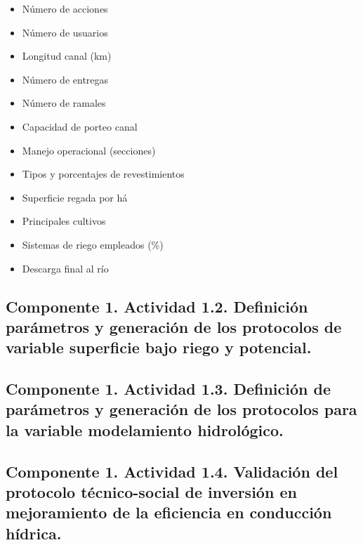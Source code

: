 \documentclass[]{article}
\begin{document}
\begin{itemize}
\item Número de acciones
\item Número de usuarios
\item Longitud canal (km)
\item Número de entregas
\item Número de ramales
\item Capacidad de porteo canal
\item Manejo operacional (secciones)
\item Tipos y porcentajes de revestimientos
\item Superficie regada por há
\item Principales cultivos
\item Sistemas de riego empleados (\%)
\item Descarga final al río
\end{itemize}

\subsection{Componente 1. Actividad 1.2. Definición parámetros y generación de los protocolos de variable superficie bajo riego y potencial.}

\subsection{Componente 1. Actividad 1.3. Definición de parámetros y generación de los protocolos para la variable modelamiento hidrológico.}


\subsection{Componente 1. Actividad 1.4. Validación del protocolo técnico-social de inversión en mejoramiento de la eficiencia en conducción hídrica.}
\end{document}
